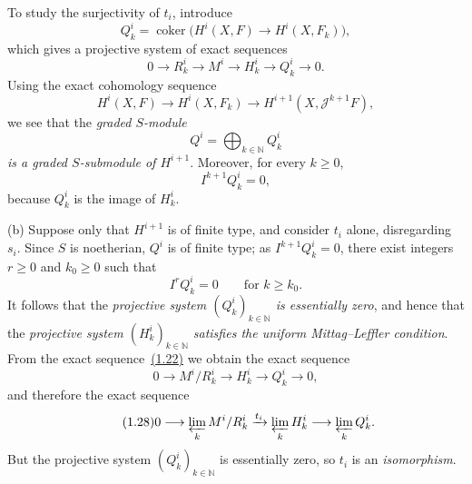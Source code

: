 \documentclass[11pt,a4paper,oneside]{book}
\theoremstyle{plain}
\theoremstyle{definition}
\theoremstyle{remark}
\begin{document}
To study the surjectivity of $t_i$, introduce
\begin{equation}
\tag{1.21}\label{eq:IX.1.21}
Q_k^i=\operatorname{coker}\bigl(H^i(X,F)\longrightarrow H^i(X,F_k)\bigr),
\end{equation}
which gives a projective system of exact sequences
\begin{equation}
\tag{1.22}\label{eq:IX.1.22}
0\longrightarrow R_k^i\longrightarrow M^i\longrightarrow H_k^i
 \longrightarrow Q_k^i\longrightarrow 0.
\end{equation}
Using the exact cohomology sequence
\begin{equation}
\tag{1.23}\label{eq:IX.1.23}
H^i(X,F)\longrightarrow H^i(X,F_k)
 \longrightarrow H^{i+1}(X,\mathcal J^{k+1}F),
\end{equation}
we see that the \emph{graded $S$-module}
\begin{equation}
\tag{1.24}\label{eq:IX.1.24}
Q^i=\bigoplus_{k\in\mathbb N}Q_k^i
\end{equation}
\emph{is a graded $S$-submodule of $H^{i+1}$}. Moreover, for every
$k\geq0$,
\begin{equation}
\tag{1.25}\label{eq:IX.1.25}
I^{k+1}Q_k^i=0,
\end{equation}
because $Q_k^i$ is the image of $H_k^i$.

\noindent\textup{(b)} Suppose only that $H^{i+1}$ is of finite type, and
consider $t_i$ alone, disregarding $s_i$. Since $S$ is noetherian, $Q^i$ is of
finite type; as $I^{k+1}Q_k^i=0$, there exist integers $r\geq0$ and $k_0\geq0$
such that
\begin{equation}
\tag{1.26}\label{eq:IX.1.26}
I^rQ_k^i=0\qquad\text{for }k\geq k_0.
\end{equation}
It follows that the \emph{projective system $(Q_k^i)_{k\in\mathbb N}$ is
essentially zero}, and hence that the \emph{projective system
$(H_k^i)_{k\in\mathbb N}$ satisfies the uniform Mittag--Leffler condition}.
From the exact sequence~\hyperref[eq:IX.1.22]{(1.22)} we obtain the exact sequence
\begin{equation}
\tag{1.27}\label{eq:IX.1.27}
0\longrightarrow M^i/R_k^i\longrightarrow H_k^i
 \longrightarrow Q_k^i\longrightarrow0,
\end{equation}
and therefore the exact sequence
\begin{equation}
\tag{1.28}\label{eq:IX.1.28}
0\longrightarrow\varprojlim_k M^i/R_k^i
 \xrightarrow{t_i}\varprojlim_k H_k^i
 \longrightarrow\varprojlim_k Q_k^i.
\end{equation}
But the projective system $(Q_k^i)_{k\in\mathbb N}$ is essentially zero, so
$t_i$ is an \emph{isomorphism}.
\end{document}
